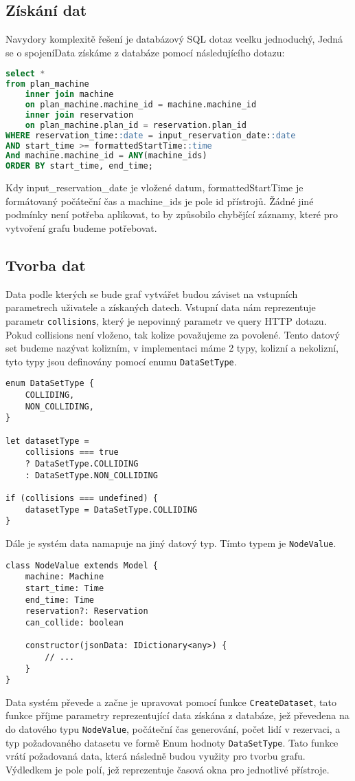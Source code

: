 \subsection{Získání dat}
Navydory komplexitě řešení je databázový SQL dotaz vcelku jednoduchý, Jedná se o spojeníData získáme z databáze pomocí následujícího dotazu:

\begin{lstlisting}[language=SQL]
select * 
from plan_machine 
    inner join machine 
	on plan_machine.machine_id = machine.machine_id
    inner join reservation
	on plan_machine.plan_id = reservation.plan_id
WHERE reservation_time::date = input_reservation_date::date
AND start_time >= formattedStartTime::time
And machine.machine_id = ANY(machine_ids)
ORDER BY start_time, end_time;
\end{lstlisting}
Kdy input\_reservation\_date je vložené datum, formattedStartTime je formátovaný počáteční čas a machine\_ids je pole id přístrojů.
Žádné jiné podmínky není potřeba aplikovat, to by způsobilo chybějící záznamy, které pro vytvoření grafu budeme potřebovat.

\subsection{Tvorba dat}
Data podle kterých se bude graf vytvářet budou záviset na vstupních parametrech uživatele a získaných datech. Vstupní data nám reprezentuje parametr \texttt{collisions}, který je nepovinný parametr ve query HTTP dotazu. Pokud collisions není vloženo, tak kolize považujeme za povolené. Tento datový set budeme nazývat kolizním, v implementaci máme 2 typy, kolizní a nekolizní, tyto typy jsou definovány pomocí enumu \texttt{DataSetType}.

\begin{lstlisting}
enum DataSetType {
    COLLIDING,
    NON_COLLIDING,
}

let datasetType =
    collisions === true
	? DataSetType.COLLIDING
	: DataSetType.NON_COLLIDING

if (collisions === undefined) {
    datasetType = DataSetType.COLLIDING
}
\end{lstlisting}

Dále je systém data namapuje na jiný datový typ. Tímto typem je \texttt{NodeValue}.

\begin{lstlisting}
class NodeValue extends Model {
    machine: Machine
    start_time: Time
    end_time: Time
    reservation?: Reservation
    can_collide: boolean

    constructor(jsonData: IDictionary<any>) {
	    // ...
    }
}
\end{lstlisting}
Data systém převede a začne je upravovat pomocí funkce \texttt{CreateDataset}, tato funkce příjme parametry reprezentující data získána z databáze, jež převedena na do datového typu \texttt{NodeValue}, počáteční čas generování, počet lidí v rezervaci, a typ požadovaného datasetu ve formě Enum hodnoty \texttt{DataSetType}. Tato funkce vrátí požadovaná data, která následně budou využity pro tvorbu grafu. Výdledkem je pole polí, jež reprezentuje časová okna pro jednotlivé přístroje.


